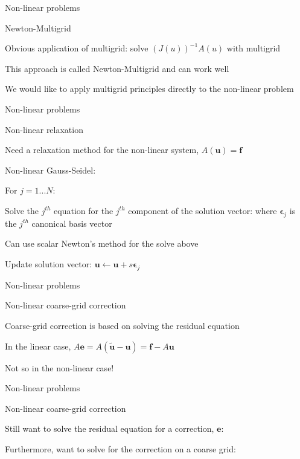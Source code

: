 \documentclass[18pt,xcolor=table]{beamer}
\begin{document}
\begin{frame}{Non-linear problems}
\begin{block}{Newton-Multigrid}
\bit
\item Obvious application of multigrid: solve $(J(u))^{-1}A(u)$ with multigrid
\item This approach is called Newton-Multigrid and can work well
\item We would like to apply multigrid principles directly to the non-linear problem
\eit
\end{block}
\end{frame}

\begin{frame}{Non-linear problems}
\begin{block}{Non-linear relaxation}
\bit
\item Need a relaxation method for the non-linear system, $A(\mathbf{u}) = \mathbf{f}$
\item Non-linear Gauss-Seidel: 
\bit
\item For $j = 1...N$:
\item Solve the $j^{th}$ equation for the $j^{th}$ component of the solution vector:
where $\mathbf{\epsilon}_j$ is the $j^{th}$ canonical basis vector
\item Can use scalar Newton's method for the solve above
\item Update solution vector: $\mathbf{u} \leftarrow \mathbf{u} + s\mathbf{\epsilon}_j$
\eit
\eit
\end{block}
\end{frame}

\begin{frame}{Non-linear problems}
\begin{block}{Non-linear coarse-grid correction}
\bit
\item Coarse-grid correction is based on solving the residual equation
\item In the linear case, $A\mathbf{e} = A(\mathbf{\tilde{u}} - \mathbf{u}) = \mathbf{f} - A\mathbf{u}$
\item Not so in the non-linear case!
\eit
\end{block}
\end{frame}

\begin{frame}{Non-linear problems}
\begin{block}{Non-linear coarse-grid correction}
\bit
\item Still want to solve the residual equation for a correction, $\mathbf{e}$:
\item Furthermore, want to solve for the correction on a coarse grid:
\eit
\end{block}
\end{frame}
\end{document}
